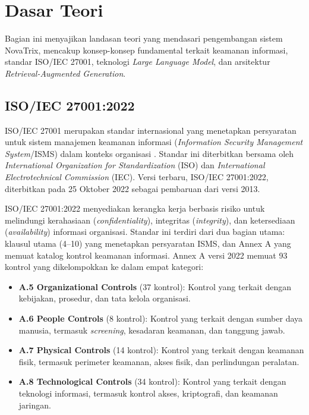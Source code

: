 \documentclass[bachelor,bahasa]{thesisdtetiugm}
\begin{document}
\section{Dasar Teori}
\label{sec:dasar-teori}

Bagian ini menyajikan landasan teori yang mendasari pengembangan sistem NovaTrix, mencakup konsep-konsep fundamental terkait keamanan informasi, standar ISO/IEC 27001, teknologi \textit{Large Language Model}, dan arsitektur \textit{Retrieval-Augmented Generation}.

\subsection{ISO/IEC 27001:2022}

ISO/IEC 27001 merupakan standar internasional yang menetapkan persyaratan untuk sistem manajemen keamanan informasi (\textit{Information Security Management System}/ISMS) dalam konteks organisasi \cite{iso27001review2022}. Standar ini diterbitkan bersama oleh \textit{International Organization for Standardization} (ISO) dan \textit{International Electrotechnical Commission} (IEC). Versi terbaru, ISO/IEC 27001:2022, diterbitkan pada 25 Oktober 2022 sebagai pembaruan dari versi 2013.

ISO/IEC 27001:2022 menyediakan kerangka kerja berbasis risiko untuk melindungi kerahasiaan (\textit{confidentiality}), integritas (\textit{integrity}), dan ketersediaan (\textit{availability}) informasi organisasi. Standar ini terdiri dari dua bagian utama: klausul utama (4--10) yang menetapkan persyaratan ISMS, dan Annex A yang memuat katalog kontrol keamanan informasi. Annex A versi 2022 memuat 93 kontrol yang dikelompokkan ke dalam empat kategori:

\begin{itemize}
	\item \textbf{A.5 Organizational Controls} (37 kontrol): Kontrol yang terkait dengan kebijakan, prosedur, dan tata kelola organisasi.
	\item \textbf{A.6 People Controls} (8 kontrol): Kontrol yang terkait dengan sumber daya manusia, termasuk \textit{screening}, kesadaran keamanan, dan tanggung jawab.
	\item \textbf{A.7 Physical Controls} (14 kontrol): Kontrol yang terkait dengan keamanan fisik, termasuk perimeter keamanan, akses fisik, dan perlindungan peralatan.
	\item \textbf{A.8 Technological Controls} (34 kontrol): Kontrol yang terkait dengan teknologi informasi, termasuk kontrol akses, kriptografi, dan keamanan jaringan.
\end{itemize}
\end{document}
